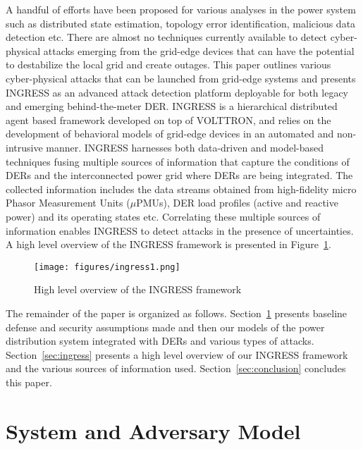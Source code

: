 \documentclass[conference]{IEEEtran}
\begin{document}
A handful of efforts have been proposed for various analyses in the power system such as distributed state estimation, topology error identification, malicious data detection etc. There are almost no techniques currently available to detect cyber-physical attacks emerging from the grid-edge devices that can have the potential to destabilize the local grid and create outages.  This paper outlines various cyber-physical attacks that can be launched from grid-edge systems and  presents INGRESS as an advanced attack detection platform deployable for both legacy and emerging behind-the-meter DER.  INGRESS is a hierarchical distributed agent based framework developed on top of VOLTTRON, and relies on the development of behavioral models of grid-edge devices in an automated and non-intrusive manner. INGRESS harnesses both data-driven and model-based techniques fusing multiple sources of information that capture the conditions of DERs and  the interconnected power grid where DERs are being integrated.  The collected information includes the data streams obtained from high-fidelity micro Phasor Measurement Units ($\mu$PMUs), DER load profiles (active and reactive power) and its operating states etc. Correlating these multiple sources of information enables INGRESS to detect attacks in the presence of uncertainties. A high level overview of the INGRESS framework is presented in Figure~\ref{ingress}.
\begin{figure}[h!]
	\centering
	\texttt{[image: figures/ingress1.png]}
	\caption{High level overview of the INGRESS framework}
	\label{ingress}
\end{figure} 
 
The remainder of the paper is organized as follows. Section~\ref{sec:system_model} presents baseline defense and security assumptions made and then our models of the power distribution system integrated with DERs and various types of attacks. Section~\ref{sec:ingress} presents a high level overview of our INGRESS framework and the various sources of information used. Section~\ref{sec:conclusion} concludes this paper.


\section{System and Adversary Model}
\label{sec:system_model}
\end{document}
